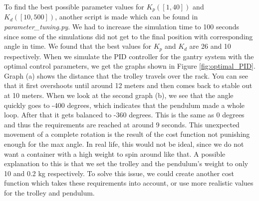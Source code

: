 \documentclass{article}
\begin{document}
To find the best possible parameter values for $K_p ([1,40])$ and $K_d ([10,500])$, another script is made which can be found in \textit{parameter\_tuning.py}. We had to increase the simulation time to 100 seconds since some of the simulations did not get to the final position with corresponding angle in time. We found that the best values for $K_p$ and $K_d$ are 26 and 10 respectively. When we simulate the PID controller for the gantry system with the optimal control parameters, we get the graphs shown in Figure \ref{fig:optimal_PID}. Graph (a) shows the distance that the trolley travels over the rack. You can see that it first overshoots until around 12 meters and then comes back to stable out at 10 meters. When we look at the second graph (b), we see that the angle quickly goes to -400 degrees, which indicates that the pendulum made a whole loop. After that it gets balanced to -360 degrees. This is the same as 0 degrees and thus the requirements are reached at around 9 seconds. This unexpected movement of a complete rotation is the result of the cost function not punishing enough for the max angle. In real life, this would not be ideal, since we do not want a container with a high weight to spin around like that. A possible explanation to this is that we set the trolley and the pendulum's weight to only 10 and 0.2 kg respectively. To solve this issue, we could create another cost function which takes these requirements into account, or use more realistic values for the trolley and pendulum.



\end{document}
